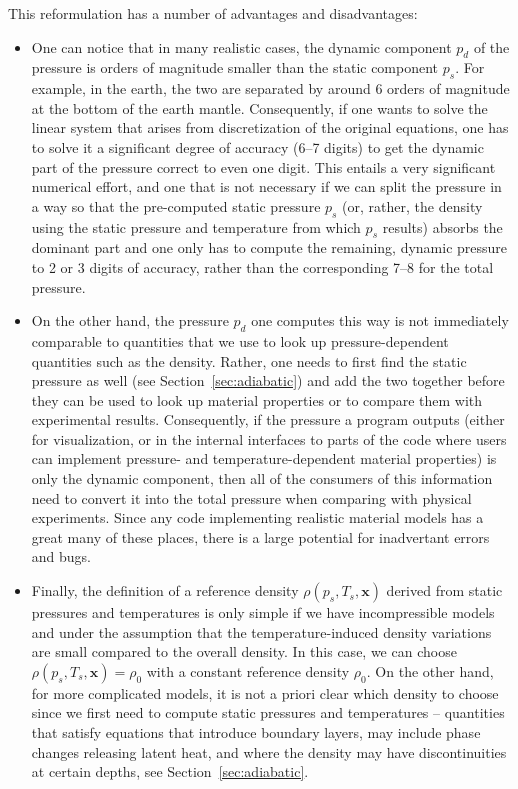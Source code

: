 \documentclass{article}
\begin{document}
This reformulation has a number of advantages and disadvantages:
\begin{itemize}
\item One can notice that in many realistic cases, the dynamic component $p_d$
  of the pressure is orders of magnitude smaller than the static component
  $p_s$. For example, in the earth, the two are separated by around 6 orders
  of magnitude at the bottom of the earth mantle. Consequently, if one wants
  to solve the linear system that arises from discretization of the original
  equations, one has to solve it a significant degree of accuracy (6--7
  digits) to get the dynamic part of the pressure correct to even one
  digit. This entails a very significant numerical effort, and one that is not
  necessary if we can split the pressure in a way so that the pre-computed
  static pressure $p_s$ (or, rather, the density using the static pressure and
  temperature from which $p_s$ results) absorbs the dominant part and one only
  has to compute the remaining, dynamic pressure to 2 or 3 digits of accuracy,
  rather than the corresponding 7--8 for the total pressure.

\item On the other hand, the pressure $p_d$ one computes this way is not immediately
  comparable to quantities that we use to look up pressure-dependent
  quantities such as the density. Rather, one needs to first find the static
  pressure as well (see Section~\ref{sec:adiabatic}) and add the two together
  before they can be used to look up material properties or to compare them with
  experimental results. Consequently, if the pressure a program outputs
  (either for visualization, or in the internal interfaces to parts of the
  code where users can implement pressure- and temperature-dependent material
  properties) is only the dynamic component, then all of the consumers of this
  information need to convert it into the total pressure when comparing with
  physical experiments. Since any code implementing realistic material models
  has a great many of these places, there is a large potential for inadvertant
  errors and bugs.

\item Finally, the definition of a reference density $\rho(p_s,T_s,\mathbf x)$
  derived from static pressures and temperatures
  is only simple if we have incompressible models and under the assumption
  that the temperature-induced density variations are small compared to the
  overall density. In this case, we can choose $\rho(p_s,T_s,\mathbf
  x)=\rho_0$ with a constant reference density $\rho_0$. On the other hand,
  for more complicated models, it is not a priori
  clear which density to choose since we first need to compute static
  pressures and temperatures -- quantities that satisfy equations that
  introduce boundary layers, may include phase changes releasing latent heat,
  and where the density may have discontinuities at certain depths, see
  Section~\ref{sec:adiabatic}.


\end{itemize}
\end{document}
